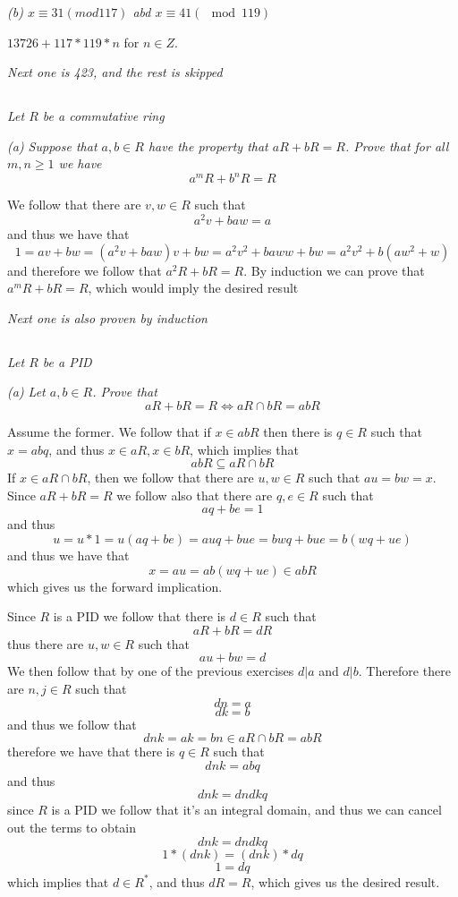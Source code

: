 \documentclass[11pt,oneside,titlepage]{book}
\DeclareMathOperator \lra {\Leftrightarrow}
\begin{document}
\textit{(b) $x \equiv 31(mod 117)$ abd $x \equiv 41 (\mod 119)$}

$13726 + 117 * 119 * n $ for $n \in Z$.

\textit{Next one is 423, and the rest is skipped}

\subsection{}

\textit{Let $R$ be a commutative ring}

\textit{(a) Suppose that $a, b \in R$ have the property that $aR + bR
= R$. Prove that for all $m, n \geq 1$ we have
  $$a^mR + b^nR = R$$
}

We follow that there are $v, w \in R$ such that
$$a^2v + baw = a$$
and thus we have that
$$1 = av + bw = (a^2v + baw)v + bw =
a^2v^2 + baww + bw = a^2v^2 + b(aw^2 + w)$$
and therefore we follow that $a^2R + bR = R$. By induction we can
prove that $a^mR + bR = R$, which would imply the desired result 

\textit{Next one is also proven by induction}

\subsection{}

\textit{Let $R$ be a PID}

\textit{(a) Let $a, b \in R$. Prove that
  $$aR + bR = R \lra aR \cap bR = abR$$
}

Assume the former. We follow that if $x \in abR$ then there is $q \in
R$ such that $x = abq$, and thus $x \in aR, x \in bR$, which implies
that
$$abR \subseteq aR \cap bR$$
If $x \in aR \cap bR$, then we follow that there are $u, w \in R$ such that
$au = bw = x$. Since $aR + bR = R$ we follow also that there are $q, e \in R$
such that
$$aq + be = 1$$
and thus
$$u = u * 1 = u(aq + be) = auq + bue = bwq + bue = b(wq + ue)$$
and thus we have that
$$x = au = a b(wq + ue) \in abR$$
which gives us the forward implication.

Since $R$ is a PID we follow that there is $d \in R$ such that
$$aR + bR = dR$$
thus there are $u, w \in R$ such that
$$au + bw = d$$
We then follow that by one of the previous exercises
$d | a$ and $d | b$. Therefore there are $n, j \in R$
such that
$$d n = a$$
$$d k = b$$
and thus we follow that
$$dnk = ak = bn \in aR \cap bR = abR$$
therefore we have that there is $q \in R$ such that
$$dnk = abq$$
and thus
$$dnk = dndkq$$
since $R$ is a PID we follow that it's an integral domain, and thus
we can cancel out the terms to obtain
$$dnk = dndkq$$
$$1 * (dnk) = (dnk) * dq$$
$$1 = dq$$
which implies that $d \in R^*$, and thus $dR = R$, which gives us the desired result.
\end{document}
